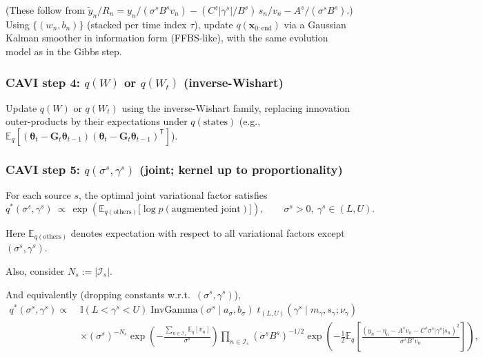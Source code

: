 \documentclass[11pt]{article}
\newcommand{\1}{\mathbb{I}}
\newcommand{\IG}{\mathrm{InvGamma}}
\newcommand{\T}{\mathsf{T}}
\newcommand{\E}{\mathbb{E}}
\begin{document}


(These follow from $\tilde y_n/R_n=y_n/(\sigma^sB^s v_n)-(C^s|\gamma^s|/B^s)\,s_n/v_n-A^s/(\sigma^sB^s)$.)
Using $\{(w_n,b_n)\}$ (stacked per time index $\tau$), update $q(\bm x_{0:\text{end}})$ via a Gaussian
Kalman smoother in information form (FFBS-like), with the same evolution model as in the Gibbs step.

\subsubsection*{CAVI step 4: $q(W)$ or $q(W_t)$ (inverse-Wishart)}
Update $q(W)$ or $q(W_t)$ using the inverse-Wishart family, replacing innovation outer-products by their
expectations under $q(\text{states})$ (e.g., $\E_q[(\bm\theta_t-\bm G_t\bm\theta_{t-1})(\bm\theta_t-\bm G_t\bm\theta_{t-1})^\T]$).

\subsubsection*{CAVI step 5: $q(\sigma^s,\gamma^s)$ (joint; kernel up to proportionality)}
For each source $s$, the optimal joint variational factor satisfies
\begin{equation}
q^*(\sigma^s,\gamma^s)\ \propto\
\exp\!\left(\E_{q(\text{others})}\big[\log p(\text{augmented joint})\big]\right),
\qquad \sigma^s>0,\ \gamma^s\in(L,U).
\label{eq:vb_qsigmagamma_def}
\end{equation}

\noindent Here $\E_{q(\text{others})}$ denotes expectation with respect to all variational factors except $(\sigma^s,\gamma^s)$.

\noindent Also, consider $N_s := |\mathcal{I}_s|$.

And equivalently (dropping constants w.r.t.\ $(\sigma^s,\gamma^s)$),
\begin{align}
q^*(\sigma^s,\gamma^s)
\propto\;&
\1(L<\gamma^s<U)\;
\IG(\sigma^s\mid a_\sigma,b_\sigma)\;
t_{(L,U)}(\gamma^s\mid m_\gamma,s_\gamma;\nu_\gamma)\nonumber\\
&\times
(\sigma^s)^{-N_s}\exp\!\left(-\frac{\sum_{n\in\mathcal{I}_s}\E_q[v_n]}{\sigma^s}\right)
\prod_{n\in\mathcal{I}_s}
(\sigma^s B^s)^{-1/2}
\exp\!\left(
-\frac{1}{2}\E_q\!\left[\frac{(y_n-\eta_n-A^s v_n-C^s\sigma^s|\gamma^s|s_n)^2}{\sigma^s B^s v_n}\right]
\right),
\label{eq:vb_qsigmagamma_kernel}
\end{align}
\end{document}
